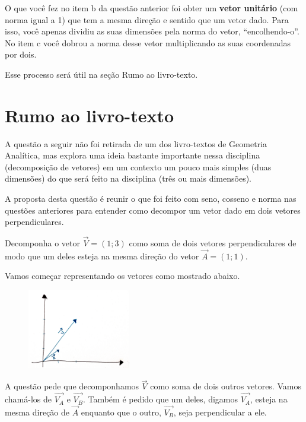 \documentclass[main.tex]{subfiles}
\begin{document}
O que você fez no item b da questão anterior foi obter um \textbf{vetor unitário} (com norma igual a 1) que tem a mesma direção e sentido que um vetor dado. Para isso, você apenas dividiu as suas dimensões pela norma do vetor, ``encolhendo-o''. No item c você dobrou a norma desse vetor multiplicando as suas coordenadas por dois.

Esse processo será útil na seção Rumo ao livro-texto.

\newpage

\section{Rumo ao livro-texto}

A questão a seguir não foi retirada de um dos livro-textos de Geometria Analítica, mas explora uma ideia bastante importante nessa disciplina (decomposição de vetores) em um contexto um pouco mais simples (duas dimensões) do que será feito na disciplina (três ou mais dimensões).

A proposta desta questão é reunir o que foi feito com seno, cosseno e norma nas questões anteriores para entender como decompor um vetor dado em dois vetores perpendiculares.

\begin{resolvida}
Decomponha o vetor $\overrightarrow{V}=(1;3)$ como soma de dois vetores perpendiculares de modo que um deles esteja na mesma direção do vetor $\overrightarrow{A}=(1;1)$.
\end{resolvida}

Vamos começar representando os vetores como mostrado abaixo.

\begin{figure}[h]
\centering
\includegraphics[width=0.4\textwidth]{./img/c4r1.jpg}
\end{figure}

A questão pede que decomponhamos $\overrightarrow{V}$ como soma de dois outros vetores. Vamos chamá-los de $\overrightarrow{V_A}$ e $\overrightarrow{V_B}$. Também é pedido que um deles, digamos $\overrightarrow{V_A}$, esteja na mesma direção de $\overrightarrow{A}$ enquanto que o outro, $\overrightarrow{V_B}$, seja perpendicular a ele.
\end{document}
